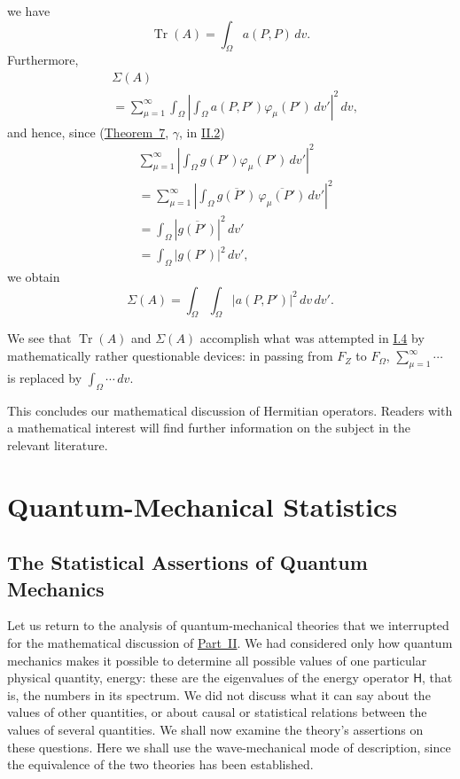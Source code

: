 \documentclass[fontsize=13pt,twoside,openany,headings=normal,parskip=false,bookmarkpackage=false,DIV=calc]{scrbook}
\begin{document}
we have
\[
\operatorname{Tr}(A)=\int_\Omega a(P,P)\,dv.
\]
Furthermore,
\begin{align*}
&\Sigma(A)\\
&=\sum_{\mu=1}^{\infty}\int_\Omega
\left|\int_\Omega a(P,P')\varphi_\mu(P')\,dv'\right|^2\,dv,
\end{align*}
and hence, since (\hyperref[thm:II.7]{Theorem~7}, $\gamma$, in \hyperref[sec:II.2]{II.2})
\begin{align*}
&\sum_{\mu=1}^{\infty}\left|\int_\Omega g(P')\varphi_\mu(P')\,dv'\right|^2\\
&=\sum_{\mu=1}^{\infty}\left|\int_\Omega
\overline{g(P')}\,\overline{\varphi_\mu(P')}\,dv'\right|^2\\
&=\int_\Omega|\overline{g(P')}|^2\,dv'\\
&=\int_\Omega|g(P')|^2\,dv',
\end{align*}
we obtain
\[
\Sigma(A)=\int_\Omega\int_\Omega|a(P,P')|^2\,dv\,dv'.
\]

We see that $\operatorname{Tr}(A)$ and $\Sigma(A)$ accomplish what was attempted in \hyperref[sec:I.4]{I.4} by mathematically rather questionable devices: in passing from $F_Z$ to $F_\Omega$, $\sum_{\mu=1}^{\infty}\cdots$ is replaced by $\int_\Omega\cdots\,dv$.

This concludes our mathematical discussion of Hermitian operators. Readers with a mathematical interest will find further information on the subject in the relevant literature.


\chapter{Quantum-Mechanical Statistics}\label{chap:III}
\section{The Statistical Assertions of Quantum Mechanics}\label{sec:III.1}
Let us return to the analysis of quantum-mechanical theories that we interrupted for the mathematical discussion of \hyperref[chap:II]{Part~II}. We had considered only how quantum mechanics makes it possible to determine all possible values of one particular physical quantity, energy: these are the eigenvalues of the energy operator $\mathsf H$, that is, the numbers in its spectrum. We did not discuss what it can say about the values of other quantities, or about causal or statistical relations between the values of several quantities. We shall now examine the theory's assertions on these questions. Here we shall use the wave-mechanical mode of description, since the equivalence of the two theories has been established.
\end{document}

